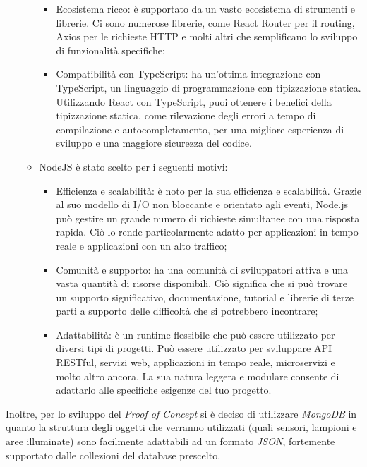 \documentclass[a4paper, 12pt]{article}
\begin{document}
\begin{itemize}
\begin{itemize}
\begin{itemize}
            \item Ecosistema ricco: è supportato da un vasto ecosistema di strumenti e librerie. Ci sono numerose librerie, come React Router per il routing, Axios per le richieste HTTP e molti altri che semplificano lo sviluppo di funzionalità specifiche;
            \item Compatibilità con TypeScript: ha un'ottima integrazione con TypeScript, un linguaggio di programmazione con tipizzazione statica. Utilizzando React con TypeScript, puoi ottenere i benefici della tipizzazione statica, come rilevazione degli errori a tempo di compilazione e autocompletamento, per una migliore esperienza di sviluppo e una maggiore sicurezza del codice.
        \end{itemize}
        \item NodeJS è stato scelto per i seguenti motivi:
        \begin{itemize}
            \item Efficienza e scalabilità: è noto per la sua efficienza e scalabilità. Grazie al suo modello di I/O non bloccante e orientato agli eventi, Node.js può gestire un grande numero di richieste simultanee con una risposta rapida. Ciò lo rende particolarmente adatto per applicazioni in tempo reale e applicazioni con un alto traffico;
            \item Comunità e supporto: ha una comunità di sviluppatori attiva e una vasta quantità di risorse disponibili. Ciò significa che si può trovare un supporto significativo, documentazione, tutorial e librerie di terze parti a supporto delle difficoltà che si potrebbero incontrare;
            \item Adattabilità: è un runtime flessibile che può essere utilizzato per diversi tipi di progetti. Può essere utilizzato per sviluppare API RESTful, servizi web, applicazioni in tempo reale, microservizi e molto altro ancora. La sua natura leggera e modulare consente di adattarlo alle specifiche esigenze del tuo progetto.
        \end{itemize}
    \end{itemize}
\end{itemize}
Inoltre, per lo sviluppo del \textit{Proof of Concept} si è deciso di utilizzare \textit{MongoDB} in quanto la struttura degli oggetti che verranno utilizzati (quali sensori, lampioni e aree illuminate) sono facilmente adattabili ad un formato \textit{JSON}, fortemente supportato dalle collezioni del database prescelto.
\vspace*{0.5cm}
\end{document}
